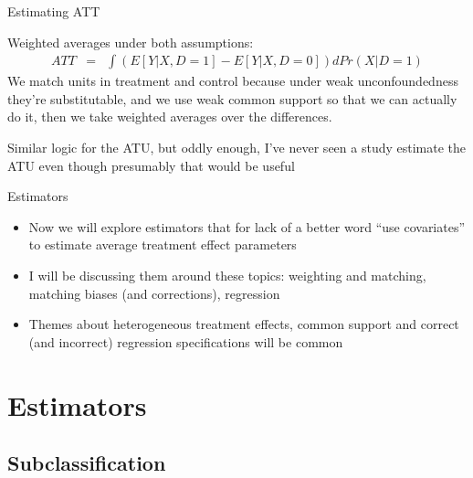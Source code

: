 \documentclass{beamer}
\begin{document}
\begin{frame}{Estimating ATT}


Weighted averages under both assumptions:
		\begin{eqnarray*}
		{ATT} &=& \int \left(E[Y|X,D=1] - E[Y|X,D=0]\right)dPr(X|D=1)
		\end{eqnarray*}
We match units in treatment and control because under weak unconfoundedness they're substitutable, and we use weak common support so that we can actually do it, then we take weighted averages over the differences.  

\bigskip

Similar logic for the ATU, but oddly enough, I've never seen a study estimate the ATU even though presumably that would be useful
		
\end{frame}



\begin{frame}{Estimators}

\begin{itemize}

\item Now we will explore estimators that for lack of a better word ``use covariates'' to estimate average treatment effect parameters
\item I will be discussing them around these topics: weighting and matching, matching biases (and corrections), regression
\item Themes about heterogeneous treatment effects, common support and correct (and incorrect) regression specifications will be common

\end{itemize}

\end{frame}





\section{Estimators }


\subsection{Subclassification}
\end{document}
